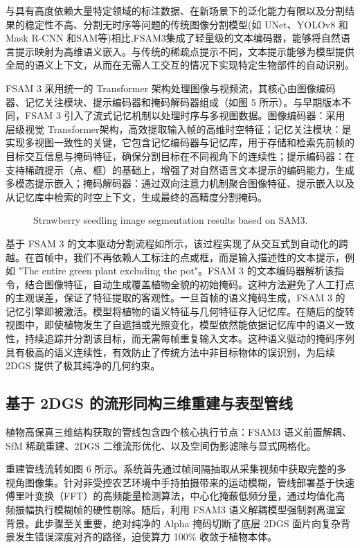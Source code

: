 \documentclass[preprint,12pt]{elsarticle}
\begin{document}
与具有高度依赖大量特定领域的标注数据、在新场景下的泛化能力有限以及分割结果的稳定性不高、分割无时序等问题的传统图像分割模型(如 UNet、YOLOv8 和 Mask R-CNN 和SAM等)相比,FSAM3集成了轻量级的文本编码器，能够将自然语言提示映射为高维语义嵌入。与传统的稀疏点提示不同，文本提示能够为模型提供全局的语义上下文，从而在无需人工交互的情况下实现特定生物部件的自动识别。

FSAM 3 采用统一的 Transformer 架构处理图像与视频流，其核心由图像编码器、记忆关注模块、提示编码器和掩码解码器组成（如图 5 所示）。与早期版本不同，FSAM 3 引入了流式记忆机制以处理时序与多视图数据。图像编码器：采用层级视觉 Transformer架构，高效提取输入帧的高维时空特征；记忆关注模块：是实现多视图一致性的关键，它包含记忆编码器与记忆库，用于存储和检索先前帧的目标交互信息与掩码特征，确保分割目标在不同视角下的连续性；提示编码器：在支持稀疏提示（点、框）的基础上，增强了对自然语言文本提示的编码能力，生成多模态提示嵌入；掩码解码器：通过双向注意力机制聚合图像特征、提示嵌入以及从记忆库中检索的时空上下文，生成最终的高精度分割掩码。

\begin{figure}[t]
\centering
\caption{Strawberry seedling image segmentation results based on SAM3.}
\label{fig:image9}
\end{figure}

基于 FSAM 3 的文本驱动分割流程如所示，该过程实现了从交互式到自动化的跨越。在首帧中，我们不再依赖人工标注的点或框，而是输入描述性的文本提示，例如 "The entire green plant excluding the pot"。FSAM 3 的文本编码器解析该指令，结合图像特征，自动生成覆盖植物全貌的初始掩码。这种方法避免了人工打点的主观误差，保证了特征提取的客观性。一旦首帧的语义掩码生成，FSAM 3 的记忆引擎即被激活。模型将植物的语义特征与几何特征存入记忆库。在随后的旋转视图中，即使植物发生了自遮挡或光照变化，模型依然能依据记忆库中的语义一致性，持续追踪并分割该目标，而无需每帧重复输入文本。这种语义驱动的掩码序列具有极高的语义连续性，有效防止了传统方法中非目标物体的误识别，为后续 2DGS 提供了极其纯净的几何约束。

\subsection{基于 2DGS 的流形同构三维重建与表型管线}

植物高保真三维结构获取的管线包含四个核心执行节点：FSAM3 语义前置解耦、SfM 稀疏重建、2DGS 二维流形优化、以及空间伪影滤除与显式网格化。

重建管线流转如图 6 所示。系统首先通过帧间隔抽取从采集视频中获取完整的多视角图像集。针对非受控农艺环境中手持拍摄带来的运动模糊，管线部署基于快速傅里叶变换（FFT）的高频能量检测算法，中心化掩蔽低频分量，通过均值化高频振幅执行模糊帧的硬性剔除。随后，利用 FSAM3 语义解耦模型强制剥离温室背景。此步骤至关重要，绝对纯净的 Alpha 掩码切断了底层 2DGS 面片向复杂背景发生错误深度对齐的路径，迫使算力 100\% 收敛于植物本体。
\end{document}
